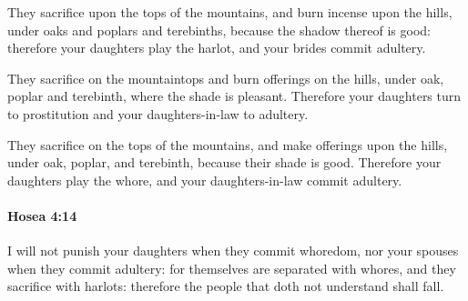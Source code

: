 			\begin{versebox}
					\item[BHS] 
					\item[LXX] 
					\item[ASV] They sacrifice upon the tops of the mountains, and burn incense upon the hills, under oaks and poplars and terebinths, because the shadow thereof is good: therefore your daughters play the harlot, and your brides commit adultery.
					\item[NIV] They sacrifice on the mountaintops and burn offerings on the hills, under oak, poplar and terebinth, where the shade is pleasant. Therefore your daughters turn to prostitution and your daughters-in-law to adultery.
					\item[NRSV] They sacrifice on the tops of the mountains, and make offerings upon the hills, under oak, poplar, and terebinth, because their shade is good. Therefore your daughters play the whore, and your daughters-in-law commit adultery.
			\end{versebox}

		\paragraph{Hosea 4:14} %
			\label{HOSEA-4-14}

			I will not punish your daughters when they commit whoredom, nor your spouses when they commit adultery: for themselves are separated with whores, and they sacrifice with harlots: therefore the people that doth not understand shall fall.

